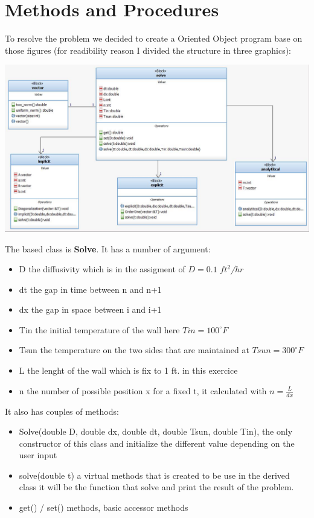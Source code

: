 \documentclass [10 pt, a4 paper]{article}
\begin{document}

\section{Methods and Procedures}

    To resolve the problem we decided to create a Oriented Object program base on 
those figures (for readibility reason I divided the structure in three graphics):
\begin{center}
    \includegraphics[scale=0.6]{General.JPG}
\end{center}
The based class is \textbf{Solve}. It has a number of argument:
\begin{itemize}
    \item D the diffusivity which is in the assigment of $D = 0.1$  \textit{$ft^{2}$/hr}
    \item dt the gap in time between n and n+1
    \item dx the gap in space between i and i+1
    \item Tin the initial temperature of the wall here $Tin = 100^{\circ}F$
    \item Tsun the temperature on the two sides that are maintained at $Tsun = 300^{\circ}F$
    \item L the lenght of the wall which is fix to 1 ft. in this exercice
    \item n the number of possible position x for a fixed t, it calculated with $n = \frac{L}{dx}$
\end{itemize}

\vspace{0.3cm}
It also has couples of methods:
\begin{itemize}
    \item Solve(double D, double dx, double dt, double Tsun, double Tin), the only constructor of 
    this class and initialize the different value depending on the user input
    \item solve(double t) a virtual methods that is created to be use in the derived class it will be the function
    that solve and print the result of the problem.
    \item get() / set() methods, basic accessor methods   
\end{itemize}
\end{document}
